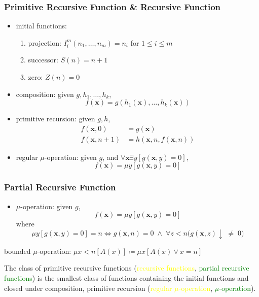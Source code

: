 \documentclass[UTF8,aspectratio=43,11pt,colorlinks,compress,openany]{beamer}%
\begin{document}
\begin{frame}\frametitle{Primitive Recursive Function \& Recursive Function}
	\begin{itemize}
		\item initial functions:
		\begin{enumerate}
			\item projection: $I_i^m(n_1,\dots,n_m)=n_i$ for $1\leq i\leq m$
			\item successor: $S(n)=n+1$
			\item zero: $Z(n)=0$
		\end{enumerate}
		\item composition: given $g,h_1,\dots,h_k$,
		\[f(\mathbf{x})=g\left(h_1(\mathbf{x}),\dots,h_k(\mathbf{x})\right)\]
		\item primitive recursion: given $g,h$,
		\begin{align*}
		f(\mathbf{x},0)&=g(\mathbf{x})\\
		f(\mathbf{x},n+1)&=h\left(\mathbf{x},n,f(\mathbf{x},n)\right)
		\end{align*}
		\item regular $\mu$-operation: given $g$, and $\forall \mathbf{x}\exists y[g(\mathbf{x},y)=0]$,
		\[f(\mathbf{x})=\mu y[g(\mathbf{x},y)=0]\]
	\end{itemize}
\end{frame}

\begin{frame}\frametitle{Partial Recursive Function}
	\begin{itemize}
		\item $\mu$-operation: given $g$,
		\[f(\mathbf{x})=\mu y\left[g(\mathbf{x},y)=0\right]\]
		where
		\[\mu y\left[g(\mathbf{x},y)=0\right]=n\iff g(\mathbf{x},n)=0\;\wedge\;\forall z<n\big(g(\mathbf{x},z)\!\downarrow\;\ne\;0\big)\]
	\end{itemize}
	bounded $\mu$-operation: $\mu x<n[A(x)]\coloneqq \mu x[A(x)\vee x=n]$
	\begin{definition}
		The class of primitive recursive functions (\textcolor{yellow}{recursive functions}, \textcolor{green}{partial recursive functions}) is the smallest class of functions containing the initial functions and closed under composition, primitive recursion (\textcolor{yellow}{regular $\mu$-operation}, \textcolor{green}{$\mu$-operation}).
	\end{definition}
\end{frame}
\end{document}
